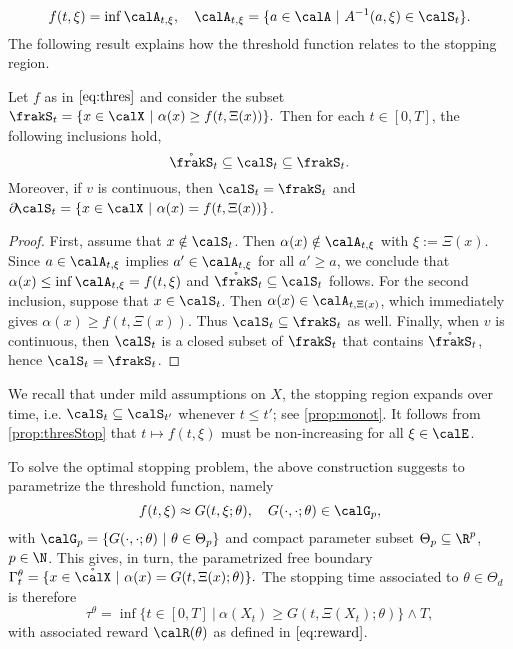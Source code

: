 \begin{equation}\label{eq:thres}
   f(t,\xi) =
\inf \calA_{t,\xi}, \quad \calA_{t,\xi} = \{a \in \calA \ | \  A^{-1}(a,\xi)\in \calS_t\}. 
\end{equation}
The following result explains how the threshold function relates to the stopping region. 
\begin{proposition}\label{prop:thresStop}
Let $f$ as in $\eqref{eq:thres}$ and consider the subset $\frakS_t = \{x\in \calX \ | \ \alpha(x)  \ge f(t,\Xi(x)) \}.$
Then  for each $t\in [0,T]$, the following inclusions hold,
$$\mathring{\frakS}_t \subseteq \calS_t  \subseteq \frakS_t. $$ 
Moreover, if  $v$ is continuous, then $\calS_t = \frakS_t$ and 
$\partial \! \calS_t = \{x\in \calX \ | \ \alpha(x) = f(t,\Xi(x))\}$.
\end{proposition}
\begin{proof}
 First, assume that $x \notin \calS_t$. Then $\alpha(x) \notin \calA_{t,\xi}$ with $\xi := \Xi(x)$. Since $a\in \calA_{t,\xi}$ implies  $a'\in \calA_{t,\xi}$ for all $a' \ge a$, we conclude that  $\alpha(x) \le  \inf \calA_{t,\xi} = f(t,\xi)$ and
 $\mathring{\frakS}_t \subseteq \calS_t$ follows. For the second inclusion, suppose that $x\in \calS_t$. Then $\alpha(x) \in \calA_{t,\Xi(x)}$,  which immediately gives $\alpha(x) \ge f(t,\Xi(x))$. Thus $\calS_t \subseteq \frakS_t$ as well. Finally, when $v$ is continuous, then $\calS_t$ is a closed subset of $\frakS_t$ that contains $\mathring{\frakS}_t$, hence $\calS_t = \frakS_t$.
\end{proof}

We recall that under mild assumptions on $X$,  %
the stopping region expands over time, i.e. $\calS_t \subseteq \calS_{t'}$ whenever $t\le t'$; see \cref{prop:monot}. 
It follows from \cref{prop:thresStop}  that   $t\mapsto f(t,\xi)$ must be non-increasing for all $\xi\in \calE$.  %

To solve the optimal stopping problem, the above construction suggests to parametrize the threshold function, namely 
\begin{equation}
    f(t,\xi) \approx G(t,\xi; \theta), \quad G(\cdot,\cdot; \theta) \in \calG_p, 
\end{equation}
with $\calG_p = \{G(\cdot,\cdot; \theta) \ | \ \theta \in \Theta_p \}$ and compact parameter subset $\Theta_p \subseteq \R^p$, $p\in \N$. This gives, in turn, the parametrized free boundary 
$\Gamma_t^{\theta} = \{x \in \mathring{\calX} \ | \ \alpha(x) = G(t,\Xi(x); \theta)\}. $ 
The stopping time associated to $\theta \in \Theta_d$ is therefore
\begin{equation}\label{eq:stopTime}
    \tau^{\theta} = \inf\{t \in [0,T] \ | \ \alpha(X_t) \ge G(t,\Xi(X_t); \theta) \} \wedge T,
\end{equation}
with associated reward  $\calR(\theta)$ as defined  in $\eqref{eq:reward}$.

